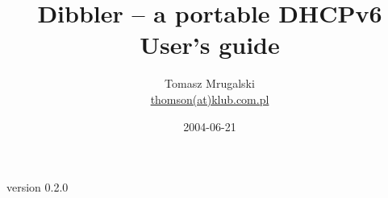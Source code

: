 \documentclass[11pt]{article}
\author{Tomasz Mrugalski\\ \small{\href{mailto:thomson(at)klub.com.pl}{thomson(at)klub.com.pl}}}
\date{2004-06-21}
\title{Dibbler -- a portable DHCPv6\\User's guide}
\begin{document}
\vspace{-4cm}
\maketitle
\vspace{-1cm}
\begin{center}
version 0.2.0
\end{center}

\newpage
\tableofcontents


\newpage










\end{document}
